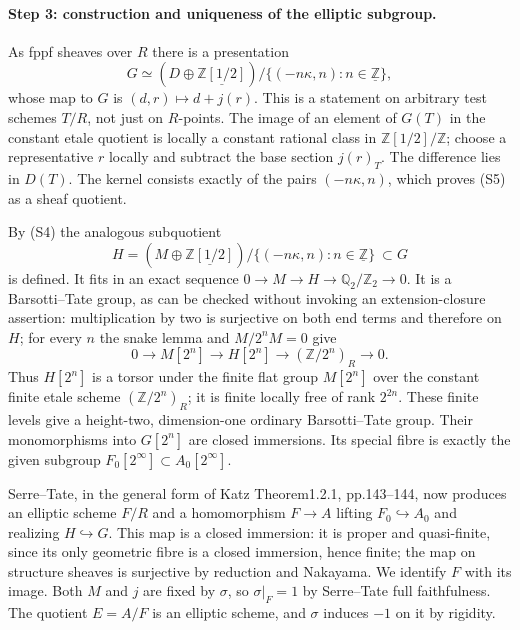 \paragraph{Step 3: construction and uniqueness of the elliptic subgroup.}
As fppf sheaves over $R$ there is a presentation
\[
 G\simeq
 (D\oplus\underline{\mathbb Z[1/2]})/
       \{(-n\kappa,n):n\in\underline{\mathbb Z}\},       \tag{S5}
\]
whose map to $G$ is $(d,r)\mapsto d+j(r)$. This is a statement on
arbitrary test schemes $T/R$, not just on $R$-points. The image of
an element of $G(T)$ in the constant etale quotient is locally a
constant rational class in $\mathbb Z[1/2]/\mathbb Z$; choose a
representative $r$ locally and subtract the base section $j(r)_T$.
The difference lies in $D(T)$. The kernel consists exactly of the
pairs $(-n\kappa,n)$, which proves (S5) as a sheaf quotient.

By (S4) the analogous subquotient
\[
 H=(M\oplus\underline{\mathbb Z[1/2]})/
       \{(-n\kappa,n):n\in\underline{\mathbb Z}\}
       \ \subset G                                      \tag{S6}
\]
is defined. It fits in an exact sequence
$0\to M\to H\to\mathbb Q_2/\mathbb Z_2\to0$.
It is a Barsotti--Tate group, as can be checked without invoking an
extension-closure assertion: multiplication by two is surjective on
both end terms and therefore on $H$; for every $n$ the snake lemma
and $M/2^nM=0$ give
\[
 0\longrightarrow M[2^n]\longrightarrow H[2^n]
 \longrightarrow (\mathbb Z/2^n)_R\longrightarrow0.     \tag{S7}
\]
Thus $H[2^n]$ is a torsor under the finite flat group $M[2^n]$ over
the constant finite etale scheme $(\mathbb Z/2^n)_R$; it is finite
locally free of rank $2^{2n}$. These finite levels give a height-two,
dimension-one ordinary Barsotti--Tate group. Their monomorphisms into
$G[2^n]$ are closed immersions. Its special fibre is exactly the
given subgroup $F_0[2^\infty]\subset A_0[2^\infty]$.

Serre--Tate, in the general form of Katz Theorem1.2.1,
pp.143--144, now produces an elliptic scheme $F/R$ and a
homomorphism $F\to A$ lifting $F_0\hookrightarrow A_0$ and
realizing $H\hookrightarrow G$. This map is a closed immersion:
it is proper and quasi-finite, since its only geometric fibre is a
closed immersion, hence finite; the map on structure sheaves is
surjective by reduction and Nakayama. We identify $F$ with its image.
Both $M$ and $j$ are fixed by $\sigma$, so $\sigma|_F=1$ by
Serre--Tate full faithfulness. The quotient $E=A/F$ is an elliptic
scheme, and $\sigma$ induces $-1$ on it by rigidity.

